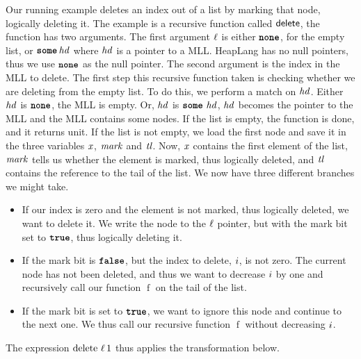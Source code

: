 \documentclass[thesis.tex]{subfiles}
\begin{document}
Our running example deletes an index out of a list by marking that node, logically deleting it.
\MLLDeleteProg
The example is a recursive function called $\textsf{\upshape delete}$, the function has two arguments. The first argument $\ell$ is either $\operatorname{\texttt{\bfseries none}}$, for the empty list, or $\operatorname{\texttt{\bfseries some}} \mathit{hd}$ where $\mathit{hd}$ is a pointer to a MLL. HeapLang has no null pointers, thus we use $\operatorname{\texttt{\bfseries none}}$ as the null pointer. The second argument is the index in the MLL to delete. The first step this recursive function taken is checking whether we are deleting from the empty list. To do this, we perform a match on $\mathit{hd}$. Either $\mathit{hd}$ is $\operatorname{\texttt{\bfseries none}}$, the MLL is empty. Or, $\mathit{hd}$ is $\operatorname{\texttt{\bfseries some}}\,\mathit{hd}$, $\mathit{hd}$ becomes the pointer to the MLL and the MLL contains some nodes. If the list is empty, the function is done, and it returns unit. If the list is not empty, we load the first node and save it in the three variables $\mathit{x}$, $\mathit{mark}$ and $\mathit{tl}$. Now, $\mathit{x}$ contains the first element of the list, $\mathit{mark}$ tells us whether the element is marked, thus logically deleted, and $\mathit{tl}$ contains the reference to the tail of the list. We now have three different branches we might take.
\begin{itemize}
  \item If our index is zero and the element is not marked, thus logically deleted, we want to delete it. We write the node to the $\ell$ pointer, but with the mark bit set to $\texttt{\bfseries true}$, thus logically deleting it.
  \item If the mark bit is $\texttt{\bfseries false}$, but the index to delete, $i$, is not zero. The current node has not been deleted, and thus we want to decrease $i$ by one and recursively call our function $\operatorname{f}$ on the tail of the list.
  \item If the mark bit is set to $\texttt{\bfseries true}$, we want to ignore this node and continue to the next one. We thus call our recursive function $\operatorname{f}$ without decreasing $i$.
\end{itemize}
The expression $\operatorname{delete}\, \ell\, 1$ thus applies the transformation below.
\end{document}
